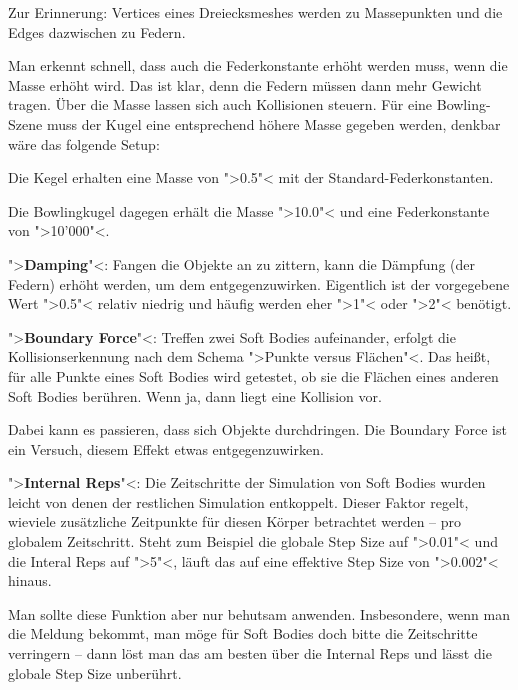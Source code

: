 \documentclass[10pt,DIV=14,a4paper]{scrartcl}
\begin{document}
	Zur Erinnerung: Vertices eines Dreiecksmeshes werden zu Massepunkten
	und die Edges dazwischen zu Federn.

	Man erkennt schnell, dass auch die Federkonstante erhöht werden
	muss, wenn die Masse erhöht wird. Das ist klar, denn die Federn
	müssen dann mehr Gewicht tragen. Über die Masse lassen sich auch
	Kollisionen steuern. Für eine Bowling-Szene muss der Kugel eine
	entsprechend höhere Masse gegeben werden, denkbar wäre das folgende
	Setup:

	\itA
		\item Die Kegel erhalten eine Masse von ">0.5"< mit der
		Standard-Federkonstanten.

		\item Die Bowlingkugel dagegen erhält die Masse ">10.0"< und
		eine Federkonstante von ">10'000"<.
	\itE

	\item ">\textbf{Damping}"<: Fangen die Objekte an zu zittern, kann
	die Dämpfung (der Federn) erhöht werden, um dem entgegenzuwirken.
	Eigentlich ist der vorgegebene Wert ">0.5"< relativ niedrig und
	häufig werden eher ">1"< oder ">2"< benötigt.

	\item ">\textbf{Boundary Force}"<: Treffen zwei Soft Bodies
	aufeinander, erfolgt die Kollisionserkennung nach dem Schema
	">Punkte versus Flächen"<. Das heißt, für alle Punkte eines Soft
	Bodies wird getestet, ob sie die Flächen eines anderen Soft Bodies
	berühren. Wenn ja, dann liegt eine Kollision vor.

	Dabei kann es passieren, dass sich Objekte durchdringen. Die
	Boundary Force ist ein Versuch, diesem Effekt etwas
	entgegenzuwirken.

	\item ">\textbf{Internal Reps}"<: Die Zeitschritte der Simulation
	von Soft Bodies wurden leicht von denen der restlichen Simulation
	entkoppelt. Dieser Faktor regelt, wieviele zusätzliche Zeitpunkte
	für diesen Körper betrachtet werden -- pro globalem Zeitschritt.
	Steht zum Beispiel die globale Step Size auf ">0.01"< und die
	Interal Reps auf ">5"<, läuft das auf eine effektive Step Size von
	">0.002"< hinaus.

	Man sollte diese Funktion aber nur behutsam anwenden. Insbesondere,
	wenn man die Meldung bekommt, man möge für Soft Bodies doch bitte
	die Zeitschritte verringern -- dann löst man das am besten über die
	Internal Reps und lässt die globale Step Size unberührt.

\itE
\end{document}
